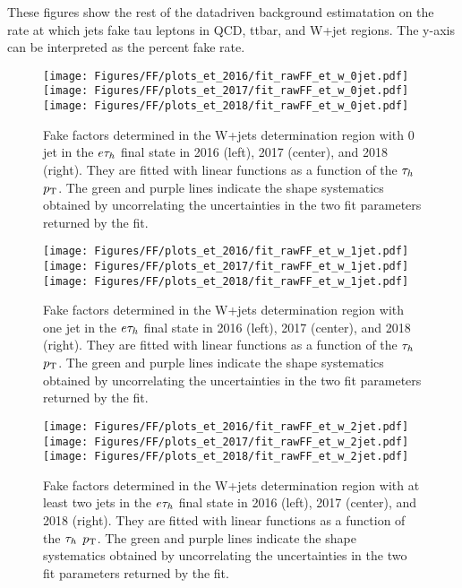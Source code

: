 These figures show the rest of the datadriven background estimatation on the rate at which jets fake tau leptons in QCD, ttbar, and W+jet regions. The y-axis can be interpreted as the percent fake rate. 

\begin{figure}[ht!b]
\centering
\texttt{[image: Figures/FF/plots\_et\_2016/fit\_rawFF\_et\_w\_0jet.pdf]}
\texttt{[image: Figures/FF/plots\_et\_2017/fit\_rawFF\_et\_w\_0jet.pdf]}
\texttt{[image: Figures/FF/plots\_et\_2018/fit\_rawFF\_et\_w\_0jet.pdf]}\\
\caption{\label{fig:fit_raw_et_0jet_w} Fake factors determined in the W+jets determination region with 0 jet in the $e\tau_h$ final state in 2016 (left), 2017 (center), and 2018 (right). They are fitted with linear functions as a function of the $\tau_h$ $p_{\mathrm{T}}$. The green and purple lines indicate the shape systematics obtained by uncorrelating the uncertainties in the two fit parameters returned by the fit.  }
\end{figure}

\begin{figure}[ht!b]
\centering
\texttt{[image: Figures/FF/plots\_et\_2016/fit\_rawFF\_et\_w\_1jet.pdf]}
\texttt{[image: Figures/FF/plots\_et\_2017/fit\_rawFF\_et\_w\_1jet.pdf]}
\texttt{[image: Figures/FF/plots\_et\_2018/fit\_rawFF\_et\_w\_1jet.pdf]}\\
\caption{\label{fig:fit_raw_et_1jet_w} Fake factors determined in the W+jets determination region with one jet in the $e\tau_h$ final state in 2016 (left), 2017 (center), and 2018 (right). They are fitted with linear functions as a function of the $\tau_h$ $p_{\mathrm{T}}$. The green and purple lines indicate the shape systematics obtained by uncorrelating the uncertainties in the two fit parameters returned by the fit.  }
\end{figure}

\begin{figure}[ht!b]
\centering
\texttt{[image: Figures/FF/plots\_et\_2016/fit\_rawFF\_et\_w\_2jet.pdf]}
\texttt{[image: Figures/FF/plots\_et\_2017/fit\_rawFF\_et\_w\_2jet.pdf]}
\texttt{[image: Figures/FF/plots\_et\_2018/fit\_rawFF\_et\_w\_2jet.pdf]}\\
\caption{\label{fig:fit_raw_et_2jet_w} Fake factors determined in the W+jets determination region with at least two jets in the $e\tau_h$ final state in 2016 (left), 2017 (center), and 2018 (right). They are fitted with linear functions as a function of the $\tau_h$ $p_{\mathrm{T}}$. The green and purple lines indicate the shape systematics obtained by uncorrelating the uncertainties in the two fit parameters returned by the fit.  }
\end{figure}


